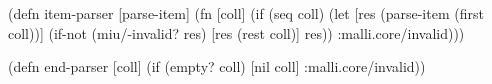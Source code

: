 \documentclass{beamer}
\begin{document}

\begin{frame}[fragile]

\begin{semiverbatim}
(defn item-parser [parse-item]
  (fn [coll]
    (if (seq coll)
      (let [res (parse-item (first coll))]
        (if-not (miu/-invalid? res)
          [res (rest coll)]
          res))
      :malli.core/invalid)))
\end{semiverbatim}

\begin{semiverbatim}
(defn end-parser [coll]
  (if (empty? coll)
    [nil coll]
    :malli.core/invalid))
\end{semiverbatim}

\end{frame}
\end{document}
